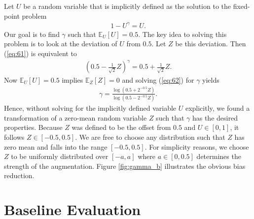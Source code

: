 \documentclass[10pt,twocolumn,letterpaper]{article}
\begin{document}
\begin{appendix}
Let $U$ be a random variable that is implicitly defined as the solution to the fixed-point problem
\begin{align}
  \label{eq:61}
  1 - U^\gamma = U.
\end{align}
Our goal is to find $\gamma$ such that $\mathbb{E}_U[U] = 0.5$. 
The key idea to solving this problem is to look at the deviation of $U$ from $0.5$. 
Let $Z$ be this deviation. Then (\ref{eq:61}) is equivalent to 
\begin{align}
  \label{eq:62}
  \left(0.5 - \frac{1}{\sqrt{2}}Z \right)^\gamma = 0.5 + \frac{1}{\sqrt{2}}Z.
\end{align}
Now $\mathbb{E}_U[U] = 0.5$ implies $\mathbb{E}_Z[Z] = 0$ and solving (\ref{eq:62}) for $\gamma$ yields
\begin{align}
  \label{eq:63}
  \gamma = \frac{\log\left(0.5 + 2^{-0.5} Z\right)}{\log \left(0.5 - 2^{-0.5} Z\right)}.
\end{align}
Hence, without solving for the implicitly defined variable $U$ explicitly, we found a transformation of a zero-mean random variable $Z$ such that $\gamma$ has the desired properties. 
Because $Z$ was defined to be the offset from $0.5$ and $U \in [0, 1]$, it follows $Z \in [-0.5, 0.5]$.
We are free to choose any distribution such that $Z$ has zero mean and falls into the range $[-0.5, 0.5]$. 
For simplicity reasons, we choose $Z$ to be uniformly distributed over $[-a, a]$ where $a \in [0, 0.5]$ determines the strength of the augmentation. 
Figure \ref{fig:gamma_b} illustrates the obvious bias reduction.


\section{Baseline Evaluation}
\label{sec:appendix:baseline}
\baselinedata
\begin{figure}[t]
\end{figure}
\end{appendix}
\end{document}
